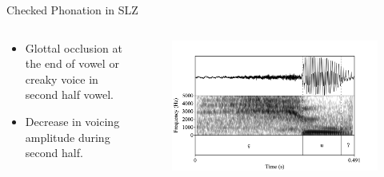 \documentclass[professionalfont]{beamer}
\begin{document}
\begin{frame}{Checked Phonation in SLZ}
  \begin{columns}
    \begin{column}{0.33\linewidth}
      \begin{itemize}
        \item Glottal occlusion at the end of vowel or creaky voice in second half vowel.
        \item Decrease in voicing amplitude during second half.
      \end{itemize}  
    \end{column}

    \begin{column}{0.67\linewidth}
      \begin{figure}[h!]
        \centering
        \includegraphics[width=\textwidth]{images/Spectrograms/RD_yu'.png}
      \end{figure}
    \end{column}
  \end{columns}
\end{frame}
\end{document}
